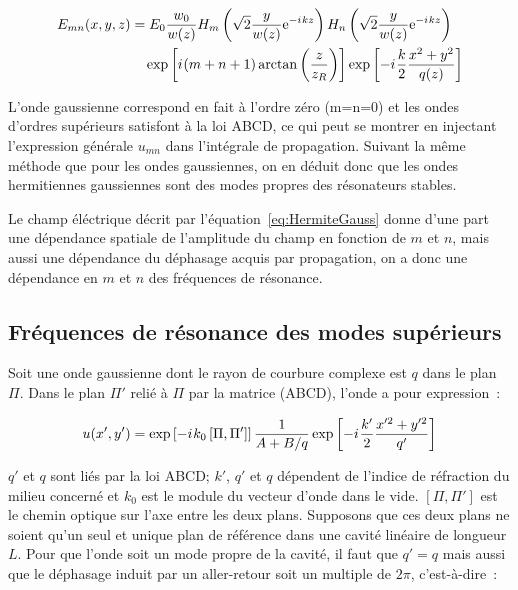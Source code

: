 \documentclass[a4paper]{book}
\newcommand{\iu}{{i\mkern1mu}}
\begin{document}
\begin{equation}
    \begin{split}
        E_{mn}(x,y,z)&=E_0\frac{w_0}{w(z)}H_m\left(\sqrt{2}\frac{y}{w(z)}\mathrm{e}^{-\iu k z}\right)H_n\left(\sqrt{2}\frac{y}{w(z)}\mathrm{e}^{-\iu k z}\right)\\
        &\quad\exp\left[\iu (m+n+1)\arctan\left(\frac{z}{z_R}\right)\right]\exp\left[-\iu \frac{k}{2}\frac{x^2+y^2}{q(z)}\right]
        \label{eq:HermiteGauss}
    \end{split}
\end{equation}

L'onde gaussienne correspond en fait à l'ordre zéro (m=n=0) et les ondes d'ordres supérieurs satisfont à la loi ABCD, ce qui peut se montrer en injectant l'expression générale $u_{mn}$ dans l'intégrale de propagation.
Suivant la même méthode que pour les ondes gaussiennes, on en déduit donc que les ondes hermitiennes gaussiennes sont des modes propres des résonateurs stables.

Le champ éléctrique décrit par l'équation~\ref{eq:HermiteGauss} donne d'une part une dépendance spatiale de l'amplitude du champ en fonction de $m$ et $n$, mais aussi une dépendance du déphasage acquis par propagation, on a donc une dépendance en $m$ et $n$ des fréquences de résonance. 


\subsection{Fréquences de résonance des modes supérieurs}

Soit une onde gaussienne dont le rayon de courbure complexe est $q$ dans le plan $\Pi$.
Dans le plan $\Pi'$ relié à $\Pi$ par la matrice (ABCD), l'onde a pour expression~:

\begin{equation}
    u(x',y')=\exp\left[-\iu k_0 \left[\Pi, \Pi'\right]\right]\frac{1}{A+B/q}\exp\left[-\iu \frac{k'}{2}\frac{x'^2+y'^2}{q'}\right]
\end{equation}

$q'$ et $q$ sont liés par la loi ABCD; $k'$, $q'$ et $q$ dépendent de l'indice de réfraction du milieu concerné et $k_0$ est le module du vecteur d'onde dans le vide. $[\Pi, \Pi']$ est le chemin optique sur l'axe entre les deux plans.
Supposons que ces deux plans ne soient qu'un seul et unique plan de référence dans une cavité linéaire de longueur $L$. Pour que l'onde soit un mode propre de la cavité, il faut que $q'=q$ mais aussi que le déphasage induit par un aller-retour soit un multiple de $2\pi$, c'est-à-dire~:
\end{document}
